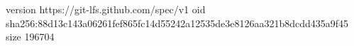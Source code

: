 version https://git-lfs.github.com/spec/v1
oid sha256:88d13c143a06261fef865fc14d55242a12535de3e8126aa321b8dcdd435a9f45
size 196704
